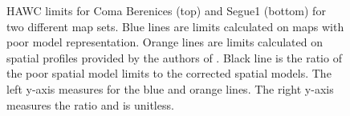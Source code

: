\begin{figure}
    \caption{HAWC limits for Coma Berenices (top) and Segue1 (bottom) for two different map sets. Blue lines are limits calculated on maps with poor model representation. Orange lines are limits calculated on spatial profiles provided by the authors of \cite{Geringer_Sameth_2015}. Black line is the ratio of the poor spatial model limits to the corrected spatial models. The left y-axis measures \sv for the blue and orange lines. The right y-axis measures the ratio and is unitless.}\label{fig:gd_jfacmodel_systematic}
\end{figure}

